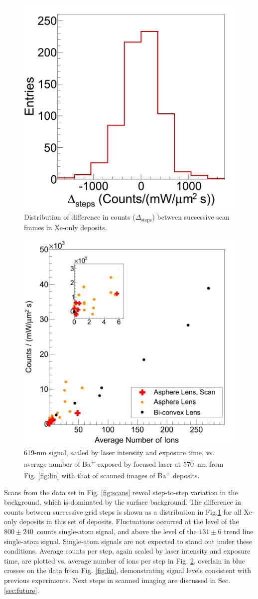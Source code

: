\begin{figure} %
        \centering
                \includegraphics[width=.35\textwidth]{figures/scans_dframeXe.png}
                \caption{Distribution of difference in counts ($\Delta_{\text{steps}}$) between successive scan frames in Xe-only deposits.}
\label{fig:scanVarXe}
\end{figure}

\begin{figure} %
        \centering
                \includegraphics[width=.45\textwidth]{figures/lin_withScan_lin.png}
                \caption{619-nm signal, scaled by laser intensity and exposure time, vs. average number of Ba\textsuperscript{+} exposed by focused laser at 570~nm from Fig. \ref{fig:lin} with that of scanned images of Ba\textsuperscript{+} deposits.}
\label{fig:linScan}
\end{figure}

Scans from the data set in Fig. \ref{fig:scans} reveal step-to-step variation in the background, which is dominated by the surface background.  The difference in counts between successive grid steps is shown as a distribution in Fig.\ref{fig:scanVarXe} for all Xe-only deposits in this set of deposits.  Fluctuations occurred at the level of the $800 \pm 240$~counts single-atom signal, and above the level of the $131 \pm 6$ trend line single-atom signal.  Single-atom signals are not expected to stand out under these conditions.  Average counts per step, again scaled by laser intensity and exposure time, are plotted vs. average number of ions per step in Fig. \ref{fig:linScan}, overlain in blue crosses on the data from Fig. \ref{fig:lin}, demonstrating signal levels consistent with previous experiments.  Next steps in scanned imaging are discussed in Sec. \ref{sec:future}.


